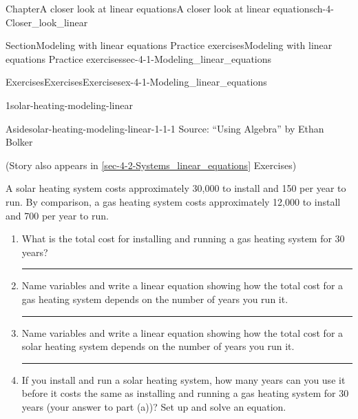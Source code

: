 \documentclass[twoside,11pt,]{book}
\newcommand{\xreffont}{\relax}
\newlength{\workspacestrutwidth}
\numberwithin{equation}{section}
\begin{document}
\begin{chapterptx}{Chapter}{A closer look at linear equations}{}{A closer look at linear equations}{}{}{ch-4-Closer_look_linear}
\renewcommand*{\chaptername}{Chapter}
%
%
\typeout{************************************************}
\typeout{************************************************}
%
\begin{sectionptx}{Section}{Modeling with linear equations \textemdash{} Practice exercises}{}{Modeling with linear equations \textemdash{} Practice exercises}{}{}{sec-4-1-Modeling_linear_equations}
%
%
\typeout{************************************************}
\typeout{************************************************}
%
\begin{exercises-subsection-numberless}{Exercises}{Exercises}{}{Exercises}{}{}{ex-4-1-Modeling_linear_equations}
\begin{divisionexercise}{1}{}{}{solar-heating-modeling-linear}%
\begin{aside}{Aside}{}{solar-heating-modeling-linear-1-1-1}%
Source: ``Using Algebra'' by Ethan Bolker%
\par
(Story also appears in \hyperref[sec-4-2-Systems_linear_equations]{{\xreffont\ref{sec-4-2-Systems_linear_equations}}} Exercises)%
\end{aside}
 A solar heating system costs approximately \textdollar{}30,000 to install and \textdollar{}150 per year to run. By comparison, a gas heating system costs approximately \textdollar{}12,000 to install and \textdollar{}700 per year to run.%
\begin{enumerate}[label=(\alph*),ref=\alph*]%
\item{}What is the total cost for installing and running a gas heating system for 30 years?%
\par\rule{\workspacestrutwidth}{1in}%
\item{}Name variables and write a linear equation showing how the total cost for a gas heating system depends on the number of years you run it.%
\par\rule{\workspacestrutwidth}{1in}%
\item{}Name variables and write a linear equation showing how the total cost for a solar heating system depends on the number of years you run it.%
\par\rule{\workspacestrutwidth}{1in}%
\item{}If you install and run a solar heating system, how many years can you use it before it costs the same as installing and running a gas heating system for 30 years (your answer to part (a))? Set up and solve an equation.%

\end{enumerate}
\end{divisionexercise}
\end{exercises-subsection-numberless}
\end{sectionptx}
\end{chapterptx}
\end{document}
